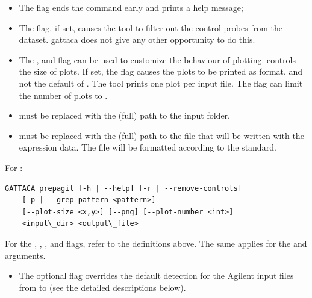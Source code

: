 \begin{itemize}
    \item The  flag ends the command early and prints a help message;
    \item The  flag, if set, causes the tool to filter out the control probes from the dataset. \gls{gattaca} does not give any other opportunity to do this.
    \item The ,  and  flag can be used to customize the behaviour of plotting.  controls the size of plots. If set, the  flag causes the plots to be printed as  format, and not the default of . The tool prints one plot per input file. The  flag can limit the number of plots to .
    \item {} must be replaced with the (full) path to the input folder.
    \item {} must be replaced with the (full) path to the file that will be written with the expression data. The file will be formatted according to the  standard.
\end{itemize}

For :
\begin{lstlisting}[style=ShellStyle]
GATTACA prepagil [-h | --help] [-r | --remove-controls]
    [-p | --grep-pattern <pattern>]
    [--plot-size <x,y>] [--png] [--plot-number <int>]
    <input\_dir> <output\_file>
\end{lstlisting}

For the , , ,  and  flags, refer to the definitions above. The same applies for the  and  arguments.
\begin{itemize}
    \item The optional flag  overrides the default detection for the Agilent input files from  to  (see the detailed descriptions below).
\end{itemize}

